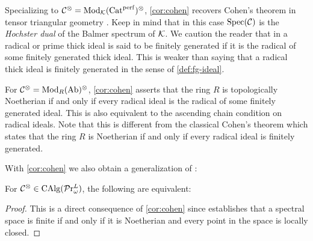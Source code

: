 \documentclass[10pt,a4paper,oneside]{article}
\begin{document}
\begin{ex}
Specializing to $\mathcal{C}^\otimes=\operatorname{Mod}_{\mathcal K}(\operatorname{Cat}^{\operatorname{perf}})^\otimes$, \cref{cor:cohen} recovers Cohen's theorem in tensor triangular geometry \cite[Theorem~B]{Barthel26}. Keep in mind that in this case $\operatorname{Spec}(\mathcal C)$ is the \textit{Hochster dual} of the Balmer spectrum of $\mathcal K$. We caution the reader that in \cite{Barthel26} a radical or prime thick ideal is said to be finitely generated if it is the radical of some finitely generated thick ideal. This is weaker than saying that a radical thick ideal is finitely generated in the sense of \cref{def:fg-ideal}.
\end{ex}

\begin{ex}
For $\mathcal{C}^\otimes=\operatorname{Mod}_{R}(\operatorname{Ab})^\otimes$, \cref{cor:cohen} asserts that the ring $R$ is topologically Noetherian if and only if every radical ideal is the radical of some finitely generated ideal. This is also equivalent to the ascending chain condition on radical ideals. Note that this is different from the classical Cohen's theorem which states that the ring $R$ is Noetherian if and only if every radical ideal is finitely generated.
\end{ex}

\begin{rem}
With \cref{cor:cohen} we also obtain a generalization of \cite[Theorem~7]{Barthel26}:
\end{rem}

\begin{cor}
For $\mathcal{C}^\otimes\in\operatorname{CAlg}(\mathcal{P}\mathrm{r}^L_{\omega})$, the following are equivalent:
\end{cor}
\begin{proof}
This is a direct consequence of \cref{cor:cohen} since \cite[Lemma~3]{Barthel26} establishes that a spectral space is finite if and only if it is Noetherian and every point in the space is locally closed.
\end{proof}

\end{document}
